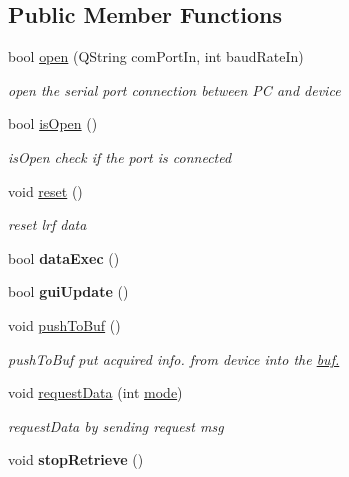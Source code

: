 \subsection*{Public Member Functions}
\begin{DoxyCompactItemize}
\item 
bool \hyperlink{classlrf__controller_a1e0539314437996eb9b832f24385eb16}{open} (Q\+String com\+Port\+In, int baud\+Rate\+In)
\begin{DoxyCompactList}\small\item\em open the serial port connection between P\+C and device \end{DoxyCompactList}\item 
bool \hyperlink{classlrf__controller_a0f807cf3d603af8445dd0db51bceae88}{is\+Open} ()
\begin{DoxyCompactList}\small\item\em is\+Open check if the port is connected \end{DoxyCompactList}\item 
\hypertarget{classlrf__controller_a57bc0e14a2b92e15b45461567346a940}{}void \hyperlink{classlrf__controller_a57bc0e14a2b92e15b45461567346a940}{reset} ()\label{classlrf__controller_a57bc0e14a2b92e15b45461567346a940}

\begin{DoxyCompactList}\small\item\em reset lrf data \end{DoxyCompactList}\item 
\hypertarget{classlrf__controller_af39dce59c5c192b3e2df5a05d5cd03c5}{}bool {\bfseries data\+Exec} ()\label{classlrf__controller_af39dce59c5c192b3e2df5a05d5cd03c5}

\item 
\hypertarget{classlrf__controller_a2540d58a92fd9a26b303336c2ddf2b45}{}bool {\bfseries gui\+Update} ()\label{classlrf__controller_a2540d58a92fd9a26b303336c2ddf2b45}

\item 
\hypertarget{classlrf__controller_adfa7a15f52e0153b88e3b81964189e2f}{}void \hyperlink{classlrf__controller_adfa7a15f52e0153b88e3b81964189e2f}{push\+To\+Buf} ()\label{classlrf__controller_adfa7a15f52e0153b88e3b81964189e2f}

\begin{DoxyCompactList}\small\item\em push\+To\+Buf put acquired info. from device into the \hyperlink{}{buf.}\end{DoxyCompactList}\item 
void \hyperlink{classlrf__controller_a6e01e4ca0763479b6a6b3f37cdef9f46}{request\+Data} (int \hyperlink{classlrf__controller_a805afcd6b3ca2c2b44c4f21b96e33e4c}{mode})
\begin{DoxyCompactList}\small\item\em request\+Data by sending request msg \end{DoxyCompactList}\item 
\hypertarget{classlrf__controller_ad57fba9a6e702535460181a270978843}{}void {\bfseries stop\+Retrieve} ()\label{classlrf__controller_ad57fba9a6e702535460181a270978843}


\end{DoxyCompactItemize}
